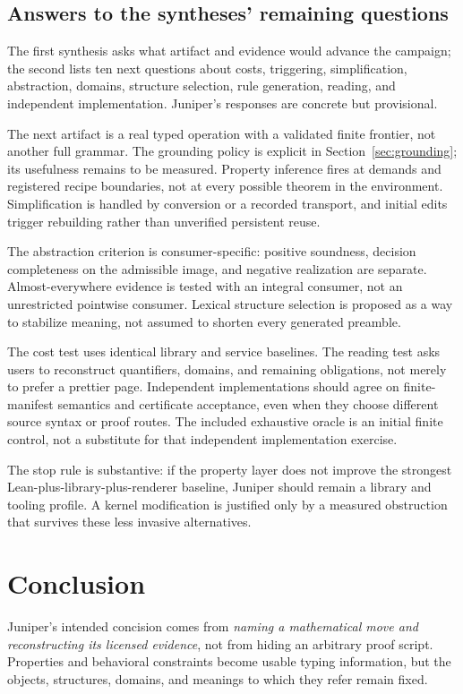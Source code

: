 \documentclass[11pt,a4paper]{article}
\theoremstyle{definition}\newtheorem{definition}[theorem]{Definition}
\theoremstyle{remark}\newtheorem{remark}[theorem]{Remark}
\begin{document}
\subsection{Answers to the syntheses' remaining questions}
The first synthesis asks what artifact and evidence would advance the campaign; the second lists ten next questions about costs, triggering, simplification, abstraction, domains, structure selection, rule generation, reading, and independent implementation. Juniper's responses are concrete but provisional.

The next artifact is a real typed operation with a validated finite frontier, not another full grammar. The grounding policy is explicit in Section~\ref{sec:grounding}; its usefulness remains to be measured. Property inference fires at demands and registered recipe boundaries, not at every possible theorem in the environment. Simplification is handled by conversion or a recorded transport, and initial edits trigger rebuilding rather than unverified persistent reuse.

The abstraction criterion is consumer-specific: positive soundness, decision completeness on the admissible image, and negative realization are separate. Almost-everywhere evidence is tested with an integral consumer, not an unrestricted pointwise consumer. Lexical structure selection is proposed as a way to stabilize meaning, not assumed to shorten every generated preamble.

The cost test uses identical library and service baselines. The reading test asks users to reconstruct quantifiers, domains, and remaining obligations, not merely to prefer a prettier page. Independent implementations should agree on finite-manifest semantics and certificate acceptance, even when they choose different source syntax or proof routes. The included exhaustive oracle is an initial finite control, not a substitute for that independent implementation exercise.

The stop rule is substantive: if the property layer does not improve the strongest Lean-plus-library-plus-renderer baseline, Juniper should remain a library and tooling profile. A kernel modification is justified only by a measured obstruction that survives these less invasive alternatives.

\section{Conclusion}
Juniper's intended concision comes from \emph{naming a mathematical move and reconstructing its licensed evidence}, not from hiding an arbitrary proof script. Properties and behavioral constraints become usable typing information, but the objects, structures, domains, and meanings to which they refer remain fixed.
\end{document}
